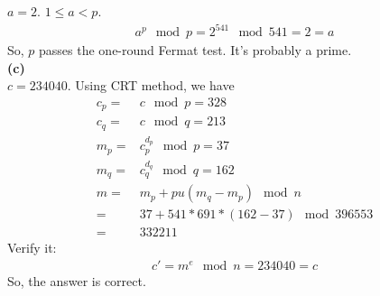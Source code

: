 \documentclass[
12pt, %
]{fphw}
\begin{document}
$a=2$. $1\leq a<p$.
\begin{align*}
	a^p \mod p=2^{541}\mod 541=2=a
\end{align*}
So, $p$ passes the one-round Fermat test. It's probably a prime.\\
\textbf{(c)}\\
$c=234040$. Using CRT method, we have
\begin{align*}
	c_p=&c \mod p=328\\
	c_q=&c\mod q=213\\
	m_p=&c_p^{d_p}\mod p=37\\
	m_q=&c_q^{d_q}\mod q=162\\
	m=&m_p+pu(m_q-m_p)\mod n\\
	=&37+541*691*(162-37) \mod 396553\\
	=&332211
\end{align*}
Verify it:
\begin{align*}
	c'=m^e \mod n=234040=c
\end{align*}
So, the answer is correct.
\end{document}
